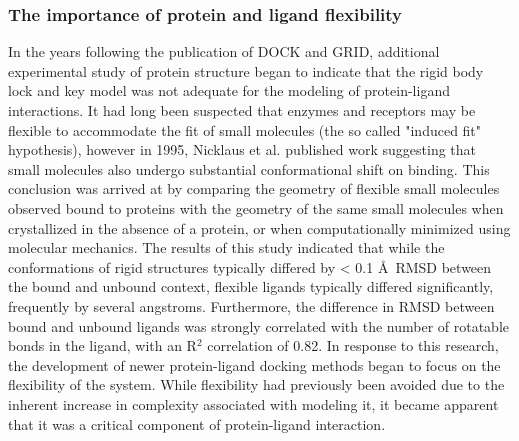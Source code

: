 \subsubsection{The importance of protein and ligand flexibility}
In the years following the publication of DOCK and GRID, additional experimental study of protein structure began to indicate that the rigid body lock and key model was not adequate for the modeling of protein-ligand interactions.
It had long been suspected \citep{KOSHLAND:1958wa} that enzymes and receptors may be flexible to accommodate the fit of small molecules (the so called "induced fit" hypothesis), however in 1995, Nicklaus et al. \citep{Nicklaus:1995tu} published work suggesting that small molecules also undergo substantial conformational shift on binding.
This conclusion was arrived at by comparing the geometry of flexible small molecules observed bound to proteins with the geometry of the same small molecules when crystallized in the absence of a protein, or when computationally minimized using molecular mechanics.
The results of this study indicated that while the conformations of rigid structures typically differed by < 0.1 \AA\ \ac{RMSD} between the bound and unbound context, flexible ligands typically differed significantly, frequently by several angstroms.
Furthermore, the difference in \ac{RMSD} between bound and unbound ligands was strongly correlated with the number of rotatable bonds in the ligand, with an R$^{2}$ correlation of 0.82.
In response to this research, the development of newer protein-ligand docking methods began to focus on the flexibility of the system.
While flexibility had previously been avoided due to the inherent increase in complexity associated with modeling it, it became apparent that it was a critical component of protein-ligand interaction.

